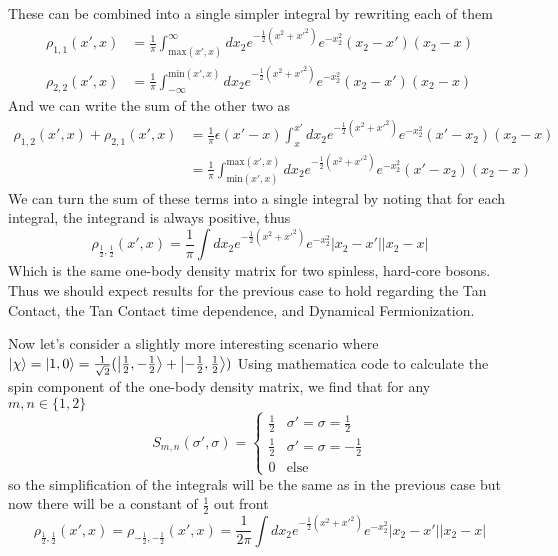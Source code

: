\documentclass[onecolumn,english,aps,pra]{revtex4}
\begin{document}
These can be combined into a single simpler integral by rewriting each of them
\begin{align*}
\rho_{1, 1}(x', x) &= \frac{1}{\pi} \int^{\infty}_{\text{max}(x', x)} dx_2 e^{-\frac{1}{2} (x^2 + x'^2) } 
 e^{-x_2^2} (x_2 - x')(x_2 - x) \\
\rho_{2,2}(x', x) &= \frac{1}{\pi} \int_{-\infty}^{\text{min}(x', x)} dx_2 e^{-\frac{1}{2} (x^2 + x'^2) } 
e^{-x_2^2} (x_2 - x')(x_2 - x) 
\end{align*}
And we can write the sum of the other two as
\begin{align*}
\rho_{1, 2}(x', x) + \rho_{2, 1}(x', x) & = \frac{1}{\pi} \epsilon(x' - x) \int_{x}^{x'} dx_2 
e^{-\frac{1}{2} (x^2 + x'^2) } e^{-x_2^2}(x' - x_2)(x_2 - x)\\
& =  \frac{1}{\pi} \int_{\text{min}(x', x)}^{\text{max}(x', x)} dx_2 
e^{-\frac{1}{2} (x^2 + x'^2) } e^{-x_2^2} (x' - x_2)(x_2 - x)
\end{align*}
We can turn the sum of these terms into a single integral by noting that for each integral, the integrand is always positive, thus
%
\begin{equation}
\rho_{\frac{1}{2}, \frac{1}{2}}(x', x)
 = \frac{1}{\pi} \int dx_2 e^{-\frac{1}{2} (x^2 + x'^2) } e^{-x_2^2} |x_2 - x'||x_2 - x|
\end{equation}
%
Which is the same one-body density matrix for two spinless, hard-core bosons. Thus we should expect results for the previous case to hold regarding the Tan Contact, the Tan Contact time dependence, and Dynamical Fermionization. 

Now let's consider a slightly more interesting scenario where
$\ket{\chi} = \ket{1, 0} = 
\frac{1}{\sqrt{2}}(\ket{\frac{1}{2}, -\frac{1}{2}} + \ket{-\frac{1}{2}, \frac{1}{2}})$
Using mathematica code to calculate the spin component of the one-body density matrix, we find that for any $m, n \in \{ 1,2 \}$
%
\begin{equation}
S_{m, n}(\sigma', \sigma) = 
\begin{cases}
	\frac{1}{2} & \sigma' = \sigma = \frac{1}{2}\\
	\frac{1}{2} & \sigma' = \sigma = -\frac{1}{2}\\
	0 & \text{else}
\end{cases}
\end{equation}
%
so the simplification of the integrals will be the same as in the previous case but now there will be a constant of $\frac{1}{2}$ out front 
\begin{equation}
\rho_{\frac{1}{2}, \frac{1}{2}}(x', x)
= \rho_{-\frac{1}{2}, -\frac{1}{2}}(x', x)
 = \frac{1}{2\pi} \int dx_2 e^{-\frac{1}{2} (x^2 + x'^2) } e^{-x_2^2} |x_2 - x'||x_2 - x|
\end{equation}

\pagebreak



\end{document}
